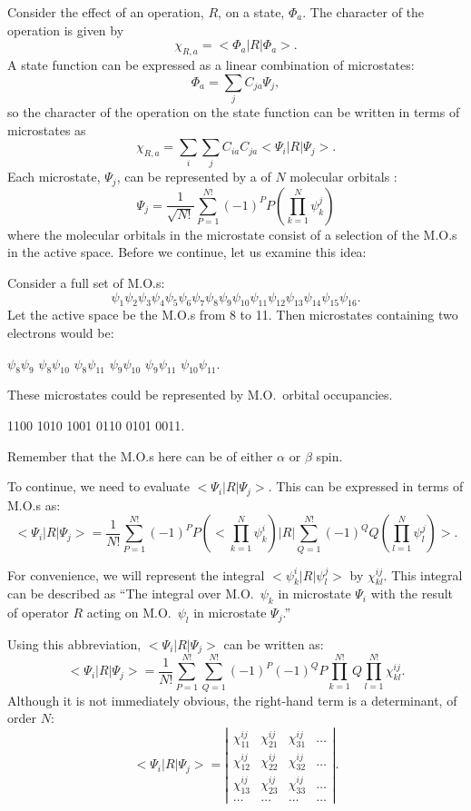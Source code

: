 Consider the effect of an operation, $R$, on a state, $\Phi_a$.  The 
character of the operation is given by
$$
\chi_{R,a} = <\Phi_a|R|\Phi_a>.
$$
A state function can be expressed as a linear combination of microstates:
$$
\Phi_a = \sum_jC_{ja}\Psi_j,
$$
so the character of the operation on the state function can be written in 
terms of microstates as
$$
\chi_{R,a} =\sum_i\sum_jC_{ia}C_{ja}<\Psi_i|R|\Psi_j>.
$$
Each microstate, $\Psi_j$, can be represented by a 
of $N$ molecular orbitals
:
$$
\Psi_j = \frac{1}{\sqrt{N!}}\sum_{P=1}^{N!}(-1)^PP(\prod_{k=1}^N\psi_k^j)
$$
 where the molecular orbitals in the microstate consist of a
selection of the M.O.s in the  active space. 
Before we continue, let us examine this idea:

Consider a full set of M.O.s:
$$
\psi_1\psi_2\psi_3\psi_4 \psi_5 \psi_6 \psi_7 \psi_8 \psi_9 
\psi_{10}\psi_{11}\psi_{12}\psi_{13}\psi_{14}\psi_{15}\psi_{16}.
$$
Let the active space be the M.O.s  from 8 to 11.  Then microstates containing
two electrons would be:
\begin{center}
\hfil
$\psi_8\psi_9$
\hfil
$\psi_8\psi_{10}$
\hfil
$\psi_8\psi_{11}$
\hfil
$\psi_9\psi_{10}$
\hfil
$\psi_9\psi_{11}$
\hfil
$\psi_{10}\psi_{11}$.
\hfil
\end{center}
These microstates could be represented by M.O.\ orbital occupancies.
\begin{center}
\hfil
1100
\hfil
1010
\hfil
1001
\hfil
0110
\hfil
0101
\hfil
0011.
\hfil
\end{center}
Remember that the M.O.s here can be of either $\alpha$ or $\beta$ spin.

To continue, we need to evaluate $<\Psi_i|R|\Psi_j>$.  This can be expressed
in terms of M.O.s as:
$$
<\Psi_i|R|\Psi_j> = \frac{1}{N!}\sum_{P=1}^{N!}(-1)^PP(<\prod_{k=1}^N\psi_k^i)|
R|
\sum_{Q=1}^{N!}(-1)^QQ(\prod_{l=1}^N\psi_l^j)>.
$$

For convenience, we will represent the integral $<\psi_k^i|R|\psi_l^j>$ by 
$\chi_{kl}^{ij}$.  This integral can be described as ``The integral over M.O.\
$\psi_k$ in microstate $\Psi_i$ with the result of operator $R$ acting
on M.O.\ $\psi_l$ in microstate $\Psi_j$.''

Using this abbreviation, $<\Psi_i|R|\Psi_j>$ can be written as:
$$
<\Psi_i|R|\Psi_j> =\frac{1}{N!}\sum_{P=1}^{N!} \sum_{Q=1}^{N!}(-1)^P(-1)^Q
P\prod_{k=1}^{N!}Q\prod_{l=1}^{N!}\chi_{kl}^{ij}.
$$
Although it is not immediately obvious, the right-hand term is a determinant,
of order $N$:
$$
<\Psi_i|R|\Psi_j> =\left|
\begin{array}{cccc}
\chi_{11}^{ij} & \chi_{21}^{ij} & \chi_{31}^{ij} & \ldots \\
\chi_{12}^{ij} & \chi_{22}^{ij} & \chi_{32}^{ij} & \ldots \\
\chi_{13}^{ij} & \chi_{23}^{ij} & \chi_{33}^{ij} & \ldots \\
 \ldots           &  \ldots           &   \ldots          & \ldots 
\end{array}
\right|.
$$

